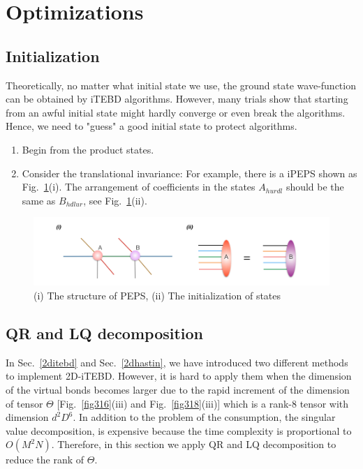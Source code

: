 \section{Optimizations}
\label{2dopt}

\subsection{Initialization}
\label{2doptInit}

Theoretically, no matter what initial state we use, the ground state wave-function can be obtained by iTEBD algorithms. However, many trials show that starting from an awful initial state might hardly converge or even break the algorithms. Hence, we need to "guess" a good initial state to protect algorithms.

\begin{enumerate}
	\item Begin from the product states.
	\item Consider the translational invariance: For example, there is a iPEPS shown as Fig.~\ref{fig321}(i). The arrangement of coefficients in the states $A_{hurdl}$ should be the same as $B_{hdlur}$, see Fig.~\ref{fig321}(ii).
\end{enumerate}

\begin{figure}[ht]
	\centering
	\includegraphics[width=1.00\textwidth]{figures/fig321.png}
	\caption[The diagrams of initializing projected entangled pair states]{(i) The structure of PEPS, (ii) The initialization of states}
	\label{fig321}
\end{figure}

\subsection{QR and LQ decomposition}
\label{2doptQR} 
In Sec.~\ref{2ditebd} and Sec.~\ref{2dhastin}, we have introduced two different methods to implement 2D-iTEBD. However, it is hard to apply them when the dimension of the virtual bonds becomes larger due to the rapid increment of the dimension of tensor $\Theta$ [Fig.~\ref{fig316}(iii) and Fig.~\ref{fig318}(iii)] which is a rank-8 tensor with dimension $d^2D^6$. In addition to the problem of the consumption, the singular value decomposition, is expensive because the time complexity is proportional to $O(M^2N)$. Therefore, in this section we apply QR and LQ decomposition to reduce the rank of $\Theta$.

